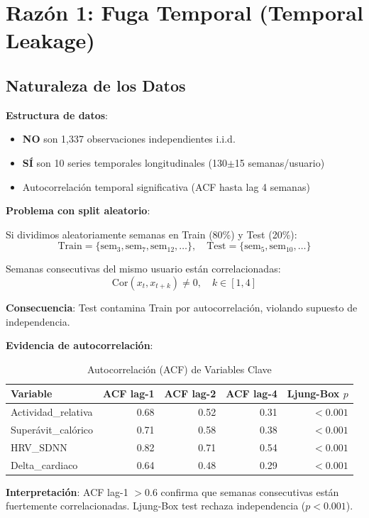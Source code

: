 \documentclass[12pt,letterpaper,twoside]{report}
\begin{document}
\section{Razón 1: Fuga Temporal (Temporal Leakage)}

\subsection{Naturaleza de los Datos}

\begin{reglabox}
\textbf{Estructura de datos}:

\begin{itemize}[noitemsep]
    \item \textbf{NO} son 1,337 observaciones independientes i.i.d.
    \item \textbf{SÍ} son 10 series temporales longitudinales (130$\pm$15 semanas/usuario)
    \item Autocorrelación temporal significativa (ACF hasta lag 4 semanas)
\end{itemize}

\textbf{Problema con split aleatorio}:

Si dividimos aleatoriamente semanas en Train (80\%) y Test (20\%):
\begin{equation}
\text{Train} = \{\text{sem}_3, \text{sem}_7, \text{sem}_{12}, \ldots\}, \quad \text{Test} = \{\text{sem}_5, \text{sem}_{10}, \ldots\}
\end{equation}

Semanas consecutivas del mismo usuario están correlacionadas:
\begin{equation}
\text{Cor}(x_t, x_{t+k}) \neq 0, \quad k \in [1, 4]
\end{equation}

\textbf{Consecuencia}: Test contamina Train por autocorrelación, violando supuesto de independencia.
\end{reglabox}

\begin{calculobox}
\textbf{Evidencia de autocorrelación}:

\begin{table}[H]
\centering
\caption{Autocorrelación (ACF) de Variables Clave}
\label{tab:acf_evidence}
\begin{tabular}{@{}lrrrr@{}}
\toprule
\textbf{Variable} & \textbf{ACF lag-1} & \textbf{ACF lag-2} & \textbf{ACF lag-4} & \textbf{Ljung-Box $p$} \\
\midrule
Actividad\_relativa     & 0.68 & 0.52 & 0.31 & $< 0.001$ \\
Superávit\_calórico     & 0.71 & 0.58 & 0.38 & $< 0.001$ \\
HRV\_SDNN               & 0.82 & 0.71 & 0.54 & $< 0.001$ \\
Delta\_cardiaco         & 0.64 & 0.48 & 0.29 & $< 0.001$ \\
\bottomrule
\end{tabular}
\end{table}

\textbf{Interpretación}: ACF lag-1 $> 0.6$ confirma que semanas consecutivas están fuertemente correlacionadas. Ljung-Box test rechaza independencia ($p<0.001$).
\end{calculobox}
\end{document}
